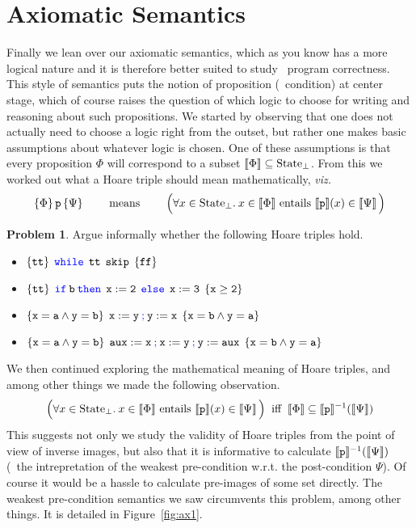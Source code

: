 \documentclass[a4paper, 11pt]{article}
\theoremstyle{definition}
\newtheorem{problem}{Problem}
\newcommand{\blue}[1]{\textcolor{blue}{#1}}
\begin{document}
\section{Axiomatic Semantics}

Finally we lean over our axiomatic semantics, which as you know has a more
logical nature and it is therefore better suited to study \eg\ program
correctness.  This style of semantics puts the notion of proposition (\ie\
condition) at center stage, which of course raises the question of which logic
to choose for writing and reasoning about such propositions.  We started by
observing that one does not actually need to choose a logic right from the
outset, but rather one makes basic assumptions about whatever logic is chosen.
One of these assumptions is that every proposition $\Phi$ will correspond to a
subset $\llbracket \Phi \rrbracket \subseteq \mathrm{State}_\bot$. From this we worked out what
a Hoare triple should mean mathematically, \emph{viz.}
\[
         \{ \Phi \} \, \mathtt{p} \, \{ \Psi \} \qquad \text{ means } \qquad 
         \Big (\forall x \in \mathrm{State}_\bot. \> x \in \llbracket \Phi \rrbracket 
         \text{ entails } \llbracket \mathtt{p} \rrbracket(x) \in \llbracket \Psi \rrbracket \, \Big )
\]

\begin{problem}
        Argue informally whether the following Hoare triples hold.
        \begin{itemize}
                \item $\{ \prog{tt} \} \> \> \prog{\blue{ while} \> \> tt \> \> skip} \> \> \{ \prog{ff} \}$
                \item $\{ \prog{tt} \} \> \> \prog{\blue{ if} \>  b \> \blue{ then} \> \> 
                        x:=2 \> \> \blue{ else} \> \> x:= 3} \> \> \{ \prog{x \geq 2} \}$
                \item $\{ \prog{x = a \wedge y = b} \} \> \>
                        \prog{x:= y \> \blue{ ;} \> y := x} \> \> \{ \prog{ x = b \wedge y = a }\}$
                \item $\{ \prog{x = a \wedge y = b} \} \> \>
                        \prog{aux := x \> \blue{ ;} \> 
                        x:= y \> \blue{ ;} \> y := aux} \> \> \{ \prog{ x = b \wedge y = a }\}$
        \end{itemize}
\end{problem}

We then continued exploring the mathematical meaning of Hoare triples, and
among other things we made the following observation.
\[
         \Big (\forall x \in \mathrm{State}_\bot. \> x \in \llbracket \Phi \rrbracket 
         \text{ entails } \llbracket \mathtt{p} \rrbracket(x) \in \llbracket \Psi \rrbracket \, \Big )
         \> \text{ iff } \>
         \llbracket \Phi \rrbracket \subseteq \llbracket \mathtt{p} \rrbracket^{-1}(\llbracket \Psi \rrbracket)
\]
This suggests not only we study the validity of Hoare triples from the point of
view of inverse images, but also that it is informative to calculate
$\llbracket \mathtt{p} \rrbracket^{-1}(\llbracket \Psi \rrbracket)$ (\ie\ the intrepretation of the weakest
pre-condition w.r.t. the post-condition $\Psi$). Of course it would be a hassle
to calculate pre-images of some set directly. The weakest pre-condition
semantics we saw circumvents this problem, among other things. It is detailed
in Figure~\ref{fig:ax1}.
\end{document}

